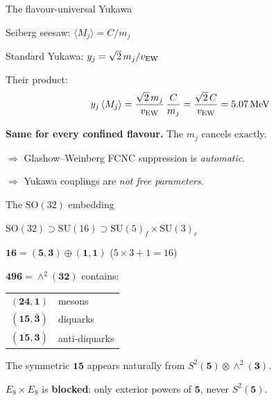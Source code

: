 \documentclass[aspectratio=169,12pt]{beamer}
\newcommand{\MeV}{\,\text{MeV}}
\begin{document}
\begin{frame}{The flavour-universal Yukawa}

Seiberg seesaw: $\langle M_j\rangle = C/m_j$

Standard Yukawa: $y_j = \sqrt{2}\,m_j/v_{\rm EW}$

\bigskip
Their product:
\begin{equation*}
y_j\,\langle M_j\rangle
= \frac{\sqrt{2}\,m_j}{v_{\rm EW}}\,\frac{C}{m_j}
= \frac{\sqrt{2}\,C}{v_{\rm EW}}
= 5.07\MeV
\end{equation*}

\textbf{Same for every confined flavour.} The $m_j$ cancels exactly.

\bigskip
$\Longrightarrow$ Glashow--Weinberg FCNC suppression is
\emph{automatic}.

$\Longrightarrow$ Yukawa couplings are \emph{not free parameters}.

\end{frame}

\begin{frame}{The $\mathrm{SO}(32)$ embedding}

$\mathrm{SO}(32) \supset \mathrm{SU}(16) \supset
\mathrm{SU}(5)_f \times \mathrm{SU}(3)_c$

\medskip
$\mathbf{16} = (\mathbf{5},\mathbf{3}) \oplus
(\mathbf{1},\mathbf{1})$
\qquad ($5 \times 3 + 1 = 16$)

\bigskip
$\mathbf{496} = \wedge^2(\mathbf{32})$ contains:

\begin{center}
\begin{tabular}{ll}
$(\mathbf{24},\mathbf{1})$ & mesons \\
$(\mathbf{15},\bar{\mathbf{3}})$ & diquarks \\
$(\overline{\mathbf{15}},\mathbf{3})$ & anti-diquarks
\end{tabular}
\end{center}

\bigskip
The symmetric $\mathbf{15}$ appears naturally from
$S^2(\mathbf{5}) \otimes \wedge^2(\mathbf{3})$.

\medskip
$E_8 \times E_8$ is \textbf{blocked}: only exterior powers
of $\mathbf{5}$, never $S^2(\mathbf{5})$.

\end{frame}
\end{document}
